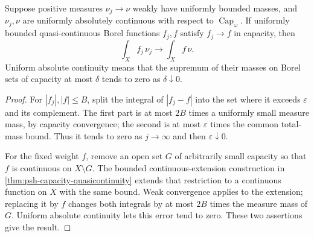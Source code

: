 \begin{lemma}\label{lem:global-capacity-weighted-measure-convergence}
Suppose positive measures $\nu_j\to\nu$ weakly have uniformly bounded masses, and $\nu_j,\nu$ are uniformly absolutely continuous with respect to $\operatorname{Cap}_\omega$. If uniformly bounded quasi-continuous Borel functions $f_j,f$ satisfy $f_j\to f$ in capacity, then
\[
 \int_Xf_j\,\nu_j\longrightarrow\int_Xf\,\nu.
\]
Uniform absolute continuity means that the supremum of their masses on Borel sets of capacity at most $\delta$ tends to zero as $\delta\downarrow0$.
\end{lemma}
\begin{proof}
For $|f_j|,|f|\leq B$, split the integral of $|f_j-f|$ into the set where it exceeds $\varepsilon$ and its complement. The first part is at most $2B$ times a uniformly small measure mass, by capacity convergence; the second is at most $\varepsilon$ times the common total-mass bound. Thus it tends to zero as $j\to\infty$ and then $\varepsilon\downarrow0$.

For the fixed weight $f$, remove an open set $G$ of arbitrarily small capacity so that $f$ is continuous on $X\setminus G$. The bounded continuous-extension construction in \cref{thm:psh-capacity-quasicontinuity} extends that restriction to a continuous function on $X$ with the same bound. Weak convergence applies to the extension; replacing it by $f$ changes both integrals by at most $2B$ times the measure mass of $G$. Uniform absolute continuity lets this error tend to zero. These two assertions give the result.
\end{proof}

